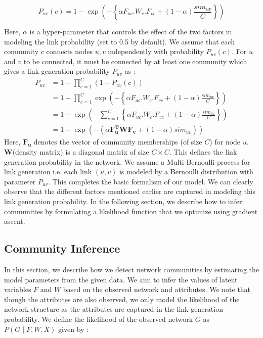 \documentclass[11pt]{article}
\begin{document}
\[ P_{uv} (c) = 1 - \exp(- \left\lbrace \alpha F_{uc}. W_c. F_{vc} + (1 - \alpha) \frac{sim_{uv}}{C} \right\rbrace ) \]

Here, $\alpha$ is a hyper-parameter that controls the effect of the two factors in modeling the link probability (set to 0.5 by default). We assume that each community $c$ connects nodes $u,v$ independently with probability $P_{uv} (c)$.  For $u$ and $v$ to be connected, it must be connected by at least one community which gives a link generation probability $P_{uv}$ as : 
\begin{align*}
P_{uv} &=  1 - \prod_{c=1}^C (1 - P_{uv}(c) )  \\
 &=1 - \prod_{c=1}^C \exp(- \left\lbrace \alpha F_{uc}. W_c. F_{vc} + (1 - \alpha) \frac{sim_{uv}}{C} \right\rbrace ) \\
 &= 1 - \exp( -\sum\limits_{c=1}^C \left\lbrace \alpha F_{uc}. W_c. F_{vc} + (1 - \alpha) \frac{sim_{uv}}{C} \right\rbrace)  \\
 &= 1 - \exp( - ( \alpha \mathbf{F_u^{T}} \mathbf{W} \mathbf{F_v} + (1 - \alpha) sim_{uv}))
\end{align*}
Here, $\mathbf{F_u}$ denotes the vector of community memberships (of size $C$) for node $u$. $\mathbf{W}$(density matrix) is a diagonal matrix of size $C \times C$.
This defines the link generation probability in the network. We assume a Multi-Bernoulli process for link generation i.e. each link $(u,v)$ is modeled by a Bernoulli distribution with parameter $P_{uv}$.  This completes the basic formalism of our model. We can clearly observe that the different factors mentioned earlier are captured in modeling this link generation probability. In the following section, we describe how to infer communities by formulating a likelihood function that we optimize using gradient ascent. 

\subsection{Community Inference}
In this section, we describe how we detect network communities by estimating the model parameters from the given data. We aim to infer the values of latent variables $F$ and $W$ based on the observed network and attributes. We note that though the attributes are also observed, we only model the likelihood of the network structure as the attributes are captured in the link generation probability. 
We define the likelihood of the observed network $G$ as  $P(G \mid F, W, X)$ given by : 
\end{document}
